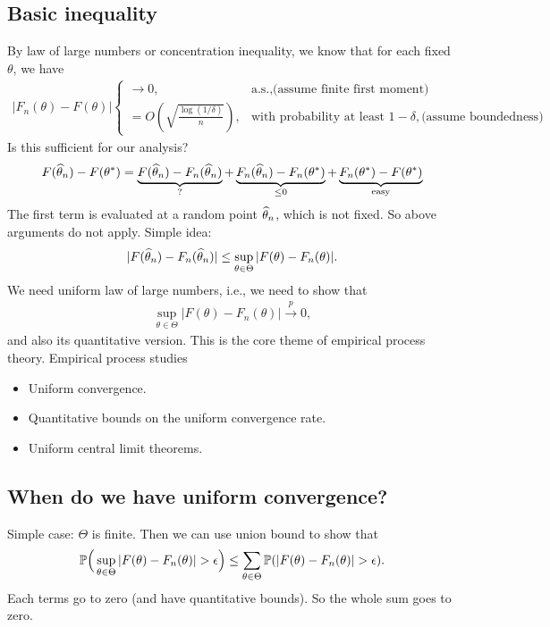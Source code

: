 \documentclass[11pt,letterpaper]{article}
\numberwithin{theorem}{lecture}
\numberwithin{proposition}{lecture}
\numberwithin{lemma}{lecture}
\numberwithin{claim}{lecture}
\numberwithin{corollary}{lecture}
\numberwithin{definition}{lecture}
\numberwithin{conjecture}{lecture}
\numberwithin{remark}{lecture}
\numberwithin{example}{lecture}
\numberwithin{equation}{lecture}
\begin{document}
\subsection{Basic inequality}
By law of large numbers or concentration inequality, we know that for each fixed $\theta$, we have
\begin{align*}
  |F_n (\theta) - F (\theta)| \begin{cases}
    \to 0, & \text{a.s.}, \text{(assume finite first moment)}\\
    = O(\sqrt{\frac{\log (1/ \delta)}{n}}), & \text{with probability at least } 1 - \delta, \text{(assume boundedness)}
  \end{cases}
\end{align*}
Is this sufficient for our analysis?
\begin{align*}
  F (\widehat{\theta}_n) - F (\theta^*) = \underbrace{F (\widehat{\theta}_n) - F_n (\widehat{\theta}_n)}_{?} + \underbrace{F_n (\widehat{\theta}_n) - F_n (\theta^*)}_{\leq 0} + \underbrace{F_n (\theta^*) - F (\theta^*)}_{\text{easy}}
\end{align*}
The first term is evaluated at a random point $\widehat{\theta}_n$, which is not fixed. So above arguments do not apply. Simple idea:
\begin{align*}
  |F (\widehat{\theta}_n) - F_n (\widehat{\theta}_n)| \leq \sup_{\theta \in \Theta} |F (\theta) - F_n (\theta)|.
\end{align*}
We need uniform law of large numbers, i.e., we need to show that
\begin{align*}
  \sup_{\theta \in \Theta} |F (\theta) - F_n (\theta)| \xrightarrow{p} 0,
\end{align*}
and also its quantitative version. This is the core theme of empirical process theory. Empirical process studies
\begin{itemize}
  \item Uniform convergence.
  \item Quantitative bounds on the uniform convergence rate.
  \item Uniform central limit theorems.
\end{itemize}
\subsection{When do we have uniform convergence?}
Simple case: $\Theta$ is finite. Then we can use union bound to show that
\begin{align*}
  {\mathbb{P}} \Big( \sup_{\theta \in \Theta} |F (\theta) - F_n (\theta)| > \epsilon \Big)\leq \sum_{\theta \in \Theta} {\mathbb{P}} (|F (\theta) - F_n (\theta)| > \epsilon).
\end{align*}
Each terms go to zero (and have quantitative bounds). So the whole sum goes to zero.
\end{document}
